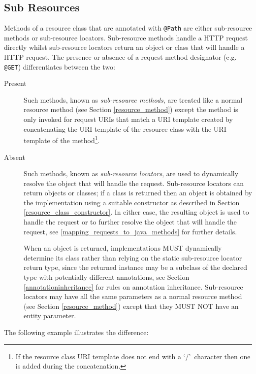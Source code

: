 \subsection{Sub Resources}
\label{sub_resources}

\textcolor{highlight green}{Methods of a resource class that are annotated with \lstinline{@Path} are either
sub-resource methods or sub-resource locators}. Sub-resource methods handle a HTTP request directly whilst sub-resource
locators return an object or class that will handle a HTTP request. The presence or absence of a request method
designator (e.g. \lstinline{@GET}) differentiates between the two:

\begin{description}
    \item[Present] Such methods, known as {\em sub-resource methods}, are treated like a normal resource method (see
    Section \ref{resource_method}) except the method is only invoked for request URIs that match a URI template created
    by concatenating the URI template of the resource class with the URI template of the method\footnote{If the resource
    class URI template does not end with a \lq/\rq\ character then one is added during the concatenation.}.

    \item[Absent] Such methods, known as {\em sub-resource locators}, are used to dynamically resolve the object that
    will handle the request. Sub-resource locators can return objects or classes; if a class is returned then an object
    is obtained by the implementation using a suitable constructor as described in Section
    \ref{resource_class_constructor}. In either case, the resulting object is used to handle the request or to further
    resolve the object that will handle the request, see \ref{mapping_requests_to_java_methods} for further details.

    When an object is returned, implementations MUST dynamically determine its class rather than relying on the static
    sub-resource locator return type, since the returned instance may be a subclass of the declared type with
    potentially different annotations, see Section \ref{annotationinheritance} for rules on annotation inheritance.
    Sub-resource locators may have all the same parameters as a normal resource method (see Section
    \ref{resource_method}) except that they MUST NOT have an entity parameter.
\end{description}

The following example illustrates the difference:

